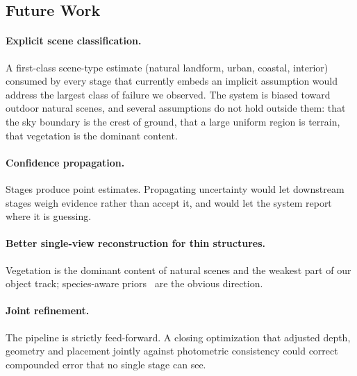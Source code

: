 \subsection{Future Work}

\paragraph{Explicit scene classification.} A first-class scene-type estimate
(natural landform, urban, coastal, interior) consumed by every stage that
currently embeds an implicit assumption would address the largest class of failure
we observed. The system is biased toward outdoor natural scenes, and several
assumptions do not hold outside them: that the sky boundary is the crest of ground,
that a large uniform region is terrain, that vegetation is the dominant content.

\paragraph{Confidence propagation.} Stages produce point estimates. Propagating
uncertainty would let downstream stages weigh evidence rather than accept it, and
would let the system report where it is guessing.

\paragraph{Better single-view reconstruction for thin structures.} Vegetation is
the dominant content of natural scenes and the weakest part of our object track;
species-aware priors~\cite{lee2024tree} are the obvious direction.

\paragraph{Joint refinement.} The pipeline is strictly feed-forward. A closing
optimization that adjusted depth, geometry and placement jointly against
photometric consistency could correct compounded error that no single stage can
see.

